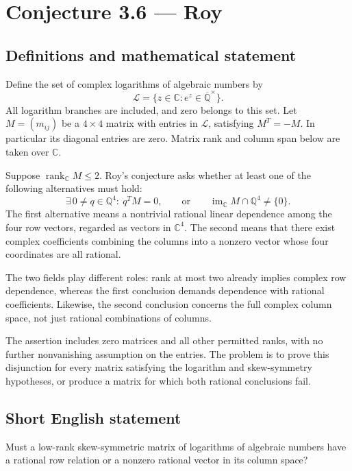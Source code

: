 \documentclass[11pt,a4paper]{article}
\begin{document}
\section*{Conjecture 3.6 — Roy}\label{statement}

\subsection{Definitions and mathematical statement}
Define the set of complex logarithms of algebraic numbers by
\[
\mathcal L=\{z\in\mathbb C:e^z\in\overline{\mathbb Q}^{\times}\}.
\]
All logarithm branches are included, and zero belongs to this set. Let $M=(m_{ij})$ be a $4\times4$ matrix with entries in $\mathcal L$, satisfying $M^T=-M$. In particular its diagonal entries are zero. Matrix rank and column span below are taken over $\mathbb C$.

Suppose $\operatorname{rank}_{\mathbb C}M\le2$. Roy's conjecture asks whether at least one of the following alternatives must hold:
\[
\exists\,0\ne q\in\mathbb Q^4:\ q^TM=0,
\qquad\text{or}\qquad
\operatorname{im}_{\mathbb C}M\cap\mathbb Q^4\ne\{0\}.
\]
The first alternative means a nontrivial rational linear dependence among the four row vectors, regarded as vectors in $\mathbb C^4$. The second means that there exist complex coefficients combining the columns into a nonzero vector whose four coordinates are all rational.

The two fields play different roles: rank at most two already implies complex row dependence, whereas the first conclusion demands dependence with rational coefficients. Likewise, the second conclusion concerns the full complex column space, not just rational combinations of columns.

The assertion includes zero matrices and all other permitted ranks, with no further nonvanishing assumption on the entries. The problem is to prove this disjunction for every matrix satisfying the logarithm and skew-symmetry hypotheses, or produce a matrix for which both rational conclusions fail.
\subsection{Short English statement}
Must a low-rank skew-symmetric matrix of logarithms of algebraic numbers have a rational row relation or a nonzero rational vector in its column space?
\end{document}
